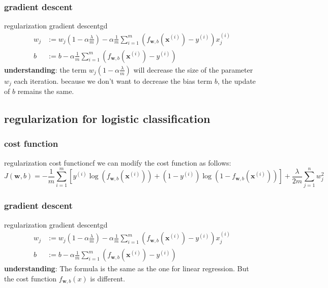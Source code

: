 \subsubsection*{gradient descent}
\begin{thmbox}{regularization gradient descent}{gd}
    \begin{align}
        w_j &:= w_j(1-\alpha\frac{\lambda}{m}) - \alpha \frac{1}{m}\sum_{i=1}^{m}\left(f_{\mathbf{w}, b}\left(\mathbf{x}^{(i)}\right)-y^{(i)}\right)x_{j}^{(i)}\\
        b &:= b - \alpha \frac{1}{m}\sum_{i=1}^{m}\left(f_{\mathbf{w}, b}\left(\mathbf{x}^{(i)}\right) - y^{(i)}\right)
    \end{align}
    \tcblower
    \textbf{understanding}: \quad the term $w_j(1-\alpha\frac{\lambda}{m})$ will decrease the size of the parameter $w_j$ each iteration.
    because we don't want to decrease the bias term $b$, the update of $b$ remains the same.
\end{thmbox}

\subsection{regularization for logistic classification}
\subsubsection*{cost function}
\begin{thmbox}{regularization cost function}{cf}
    we can modify the cost function as follows:
    \begin{equation}
        J(\mathbf{w}, b) = -\frac{1}{m}\sum_{i=1}^{m}\left[y^{(i)}\log(f_{\mathbf{w}, b}\left(\mathbf{x}^{(i)}\right)) + (1-y^{(i)})\log(1-f_{\mathbf{w}, b}\left(\mathbf{x}^{(i)}\right))\right] + \frac{\lambda}{2m}\sum_{j=1}^{n}w_j^2
    \end{equation}
\end{thmbox}
\subsubsection*{gradient descent}
\begin{thmbox}{regularization gradient descent}{gd}
    \begin{align}
        w_j &:= w_j(1-\alpha\frac{\lambda}{m}) - \alpha \frac{1}{m}\sum_{i=1}^{m}\left(f_{\mathbf{w}, b}\left(\mathbf{x}^{(i)}\right)-y^{(i)}\right)x_{j}^{(i)}\\
        b &:= b - \alpha \frac{1}{m}\sum_{i=1}^{m}\left(f_{\mathbf{w}, b}\left(\mathbf{x}^{(i)}\right) - y^{(i)}\right)
    \end{align}
    \tcblower
    \textbf{understanding}: \quad The formula is the same as the one for linear regression.
    But the cost function $f_{\mathbf{w}, b}(x)$ is different.
\end{thmbox}